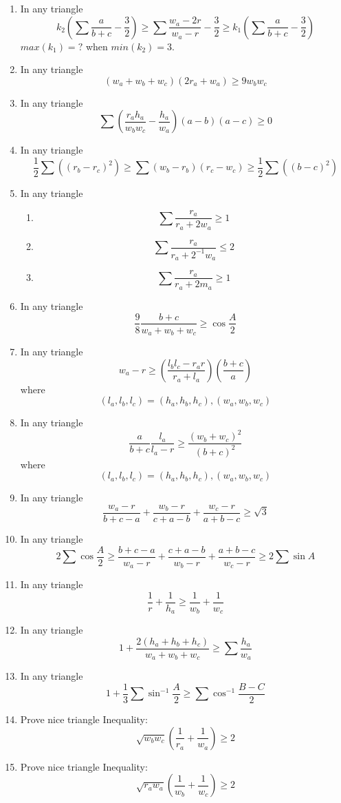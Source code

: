 \documentclass{report}
\begin{document}
\begin{enumerate}
	\item In any triangle$$k_2\left( \sum\frac {a}{b + c} - \frac {3}{2}\right) \geq \sum\frac {w_a - 2r}{w_a - r} - \frac {3}{2} \geq k_1\left( \sum\frac {a}{b + c} - \frac {3}{2}\right) $$	$max(k_1)=?$ when $min(k_2)=3$.
	\item In any triangle$$(w_a+w_b+w_c)(2r_a+w_a)\geq 9w_bw_c$$	
	\item In any triangle$$\sum\left( \frac {r_ah_a}{w_bw_c} - \frac {h_a}{w_a}\right) (a - b)(a - c)\geq0$$	
	\item In any triangle$$\frac{1}{2}\sum((r_b-r_c)^2)\geq \sum{(w_b-r_b)(r_c-w_c)}\geq \frac{1}{2}\sum((b-c)^2)$$	
	\item In any triangle\begin{enumerate}\item $$\sum\frac {r_a}{r_a + 2w_a}\geq1$$\item $$\sum\frac {r_a}{r_a + 2^{ - 1}w_a}\le2$$\item $$\sum\frac {r_a}{r_a + 2m_a}\geq1$$\end{enumerate}	
	\item In any triangle$$\frac{9}{8}\frac{b+c}{w_a+w_b+w_c} \geq \cos\frac{A}{2}$$	
	\item In any triangle$$w_a - r \geq \left( \frac {l_bl_c - r_ar}{r_a + l_a}\right) \left( \frac {b + c}{a}\right) $$	where$$(l_a,l_b,l_c) = (h_a,h_b,h_c),(w_a,w_b,w_c)$$
	\item In any triangle$$\frac{a}{b+c}\frac{l_a}{l_a-r} \geq \frac{(w_b+w_c)^2}{(b+c)^2}$$	where$$(l_a,l_b,l_c) = (h_a,h_b,h_c),(w_a,w_b,w_c)$$
	\item In any triangle$$\frac{w_a-r}{b+c-a}+\frac{w_b-r}{c+a-b}+\frac{w_c-r}{a+b-c} \geq \sqrt{3}$$	
	\item In any triangle$$2\sum\cos\frac{A}{2} \geq \frac{b+c-a}{w_a-r}+\frac{c+a-b}{w_b-r}+\frac{a+b-c}{w_c-r} \geq 2\sum\sin{A}$$	
	\item In any triangle$$\frac{1}{r}+\frac{1}{h_a} \geq \frac{1}{w_b}+\frac{1}{w_c}$$	
	\item In any triangle$$1 + \frac {2(h_a + h_b + h_c)}{w_a + w_b + w_c} \geq \sum\frac {h_a}{w_a}$$	
	\item In any triangle$$1 + \frac {1}{3}\sum{\sin^{ - 1}\frac {A}{2}} \geq \sum\cos^{ - 1}\frac {B - C}{2}$$	
	\item Prove nice triangle Inequality:$$ \sqrt {w_bw_c}(\frac {1}{r_a} + \frac {1}{w_a}) \geq 2$$
	\item Prove nice triangle Inequality:$$\sqrt {r_aw_a}(\frac {1}{w_b} + \frac {1}{w_c}) \geq 2$$

\end{enumerate}
\end{document}
